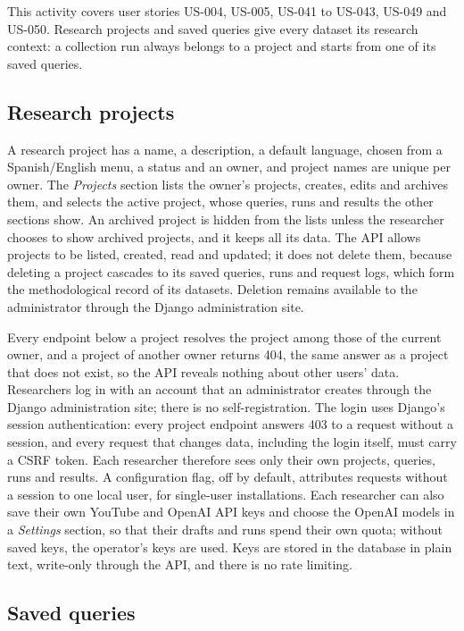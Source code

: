 This activity covers user stories US-004, US-005, US-041 to US-043, US-049 and US-050. Research projects and saved queries give every dataset its research context: a collection run always belongs to a project and starts from one of its saved queries.

\subsection{Research projects}

A research project has a name, a description, a default language, chosen from a Spanish/English menu, a status and an owner, and project names are unique per owner. The \emph{Projects} section lists the owner's projects, creates, edits and archives them, and selects the active project, whose queries, runs and results the other sections show. An archived project is hidden from the lists unless the researcher chooses to show archived projects, and it keeps all its data. The API allows projects to be listed, created, read and updated; it does not delete them, because deleting a project cascades to its saved queries, runs and request logs, which form the methodological record of its datasets. Deletion remains available to the administrator through the Django administration site.

Every endpoint below a project resolves the project among those of the current owner, and a project of another owner returns 404, the same answer as a project that does not exist, so the API reveals nothing about other users' data. Researchers log in with an account that an administrator creates through the Django administration site; there is no self-registration. The login uses Django's session authentication: every project endpoint answers 403 to a request without a session, and every request that changes data, including the login itself, must carry a CSRF token. Each researcher therefore sees only their own projects, queries, runs and results. A configuration flag, off by default, attributes requests without a session to one local user, for single-user installations. Each researcher can also save their own YouTube and OpenAI API keys and choose the OpenAI models in a \emph{Settings} section, so that their drafts and runs spend their own quota; without saved keys, the operator's keys are used. Keys are stored in the database in plain text, write-only through the API, and there is no rate limiting.

\subsection{Saved queries}

